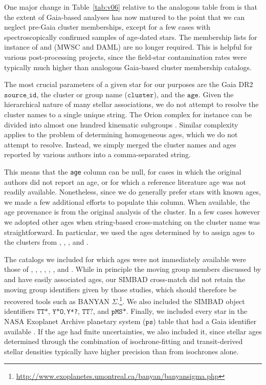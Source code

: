 \documentclass[12pt,modern,twocolumn,tighten]{aastex63}
\begin{document}
One major change in Table~\ref{tab:v06} relative to the analogous
table from \citet{bouma_cdipsI_2019} is that the extent of Gaia-based
analyses has now matured to the point that we can neglect pre-Gaia
cluster memberships, except for a few cases with spectroscopically
confirmed samples of age-dated stars.  The membership lists for
instance of \citet{Kharchenko_et_al_2013} and \citet{dias_proper_2014}
(MWSC and DAML) are no longer required.  This is helpful for various
post-processing projects,  since the field-star contamination rates
were typically much higher than analogous Gaia-based cluster membership
catalogs.

The most crucial parameters of a given star for our purposes are the
Gaia DR2 $\texttt{source\_id}$, the cluster or
group name ($\texttt{cluster}$), and the $\texttt{age}$.  Given the
hierarchical nature of many stellar associations, we do not attempt to
resolve the cluster names to a single unique string.  The Orion
complex for instance can be divided into almost one hundred kinematic
subgroups \citep{kounkel_apogee2_2018}.  Similar complexity applies to
the problem of determining homogeneous ages, which we do not attempt
to resolve.  Instead, we simply merged the cluster names and ages
reported by various authors into a comma-separated string.

This means that the \texttt{age} column can be null, for cases in
which the original authors did not report an age, or for which a reference
literature age was not readily available.  Nonetheless, since we do
generally prefer stars with known ages, we made a few additional
efforts to populate this column.  When available, the age provenance
is from the original analysis of the cluster.  In a few cases
however we adopted other ages when string-based cross-matching on the
cluster name was straightforward.  In particular, we used the ages
determined by \citet{CantatGaudin2020b} to assign ages to the clusters
from \citet{GaiaCollaboration2018}, \citet{CantatGaudin2018a},
\citet{CastroGinard2020}, and \citet{CantatGaudin2020a}.

The catalogs we included for which ages were not immediately available
were those of \citet{CottenSong2016}, \citet{Oh2017},
\citet{Zari2018}, \citet{Gagne2018b},
\citet{Gagne2018a}, \citet{Gagne2018c}, and \citet{Ujjwal2020}.  While
in principle the moving group members discussed by
\citet{Gagne2018b,Gagne2018a,Gagne2018c} and \citet{Ujjwal2020} have
easily associated ages, our SIMBAD cross-match did not retain the moving group
identifiers given by those studies, which should therefore be recovered
tools such as BANYAN
$\Sigma$.\footnote{\url{http://www.exoplanetes.umontreal.ca/banyan/banyansigma.php}}.
We also included the SIMBAD object identifiers $\texttt{TT*}$,
$\texttt{Y*O}, $\texttt{Y*?}, $\texttt{TT?}$, and $\texttt{pMS*}$.
Finally, we  included every star in the NASA Exoplanet Archive
planetary system ($\texttt{ps}$) table that had a Gaia identifier available
\citep{NASAExoArchive_ps_20210506}.  If the age had finite
uncertainties, we also included it, since stellar ages determined
through the combination of isochrone-fitting and transit-derived
stellar densities typically have higher precision than from isochrones
alone.
\end{document}
